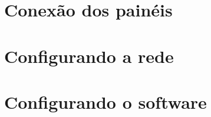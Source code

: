 \documentclass[12pt, a4paper]{article}
\begin{document}
	\section{Conexão dos painéis}\label{Conexão dos painéis}

	\section{Configurando a rede}\label{Configurando a rede}

	\section{Configurando o software}\label{Configurando o software}
\cleardoublepage

\end{document}
